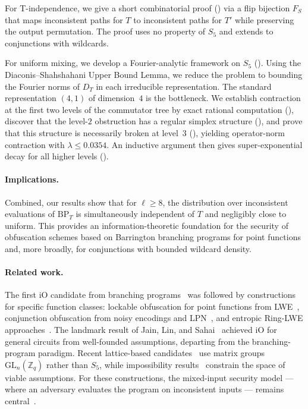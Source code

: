 \documentclass[11pt]{article}
\newcommand{\BP}{\mathrm{BP}}
\begin{document}
For T-independence, we give a short combinatorial proof ()
via a flip bijection $F_S$ that maps inconsistent paths for $T$ to
inconsistent paths for $T'$ while preserving the output permutation. The proof
uses no property of $S_5$ and extends to conjunctions with wildcards.

For uniform mixing, we develop a Fourier-analytic framework on $S_5$
(). Using the Diaconis--Shahshahani Upper Bound
Lemma, we reduce the problem to bounding the Fourier norms of $D_T$ in
each irreducible representation. The standard representation $(4,1)$ of
dimension~$4$ is the bottleneck. We establish contraction at the first
two levels of the commutator tree by exact rational computation
(), discover that the level-$2$ obstruction
has a regular simplex structure (), and prove that this
structure is necessarily broken at level~$3$ (), yielding
operator-norm contraction with $\lambda \leq 0.0354$. An inductive argument
then gives super-exponential decay for all higher levels ().

\paragraph{Implications.}
Combined, our results show that for $\ell \geq 8$, the distribution
over inconsistent evaluations of $\BP_T$ is simultaneously independent of
$T$ and negligibly close to uniform. This provides an information-theoretic
foundation for the security of obfuscation schemes based on Barrington branching
programs for point functions and, more broadly, for conjunctions with
bounded wildcard density.

\paragraph{Related work.}
The first iO candidate from branching programs~\cite{GGH+13} was followed
by constructions for specific function
classes: lockable obfuscation for point functions from
LWE~\cite{GKW17,WZ17}, conjunction obfuscation from noisy encodings
and LPN~\cite{BKMPRS18,BLMZ19}, and entropic Ring-LWE
approaches~\cite{BVWW16}.  The landmark result of Jain, Lin, and
Sahai~\cite{JLS21} achieved iO for general circuits from well-founded
assumptions, departing from the branching-program paradigm.  Recent
lattice-based candidates~\cite{BDGM20,WW21,HJL25} use matrix groups
$\mathrm{GL}_n(\mathbb{Z}_q)$ rather than $S_5$, while impossibility
results~\cite{DJMMV25} constrain the space of viable assumptions.
For these constructions, the mixed-input security model --- where an
adversary evaluates the program on inconsistent inputs --- remains
central~\cite{CVW18}.
\end{document}
